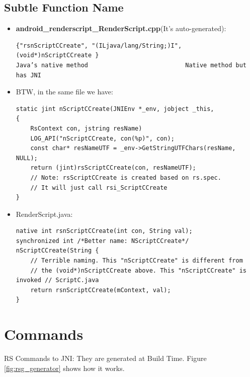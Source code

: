 \subsection{Subtle Function Name}
\label{ss:Stupid}

\begin{itemize}
	\item \textbf{android\_renderscript\_RenderScript.cpp}(It's auto-generated):
		\begin{lstlisting}[style=nonumbers]
{"rsnScriptCCreate", "(ILjava/lang/String;)I", (void*)nScriptCCreate }
Java’s native method				           Native method but has JNI
		\end{lstlisting} 
	\item BTW, in the same file we have:
		\begin{lstlisting}[style=nonumbers]
static jint nScriptCCreate(JNIEnv *_env, jobject _this,
{
	RsContext con, jstring resName)
	LOG_API("nScriptCCreate, con(%p)", con); 
	const char* resNameUTF = _env->GetStringUTFChars(resName, NULL); 
	return (jint)rsScriptCCreate(con, resNameUTF); 
	// Note: rsScriptCCreate is created based on rs.spec.
	// It will just call rsi_ScriptCCreate
}
		\end{lstlisting}
	\item RenderScript.java:
			\begin{lstlisting}[style=nonumbers]
native int rsnScriptCCreate(int con, String val); 
synchronized int /*Better name: NScriptCCreate*/ nScriptCCreate(String { 			
	// Terrible naming. This "nScriptCCreate" is different from
	// the (void*)nScriptCCreate above. This "nScriptCCreate" is invoked // ScriptC.java
	return rsnScriptCCreate(mContext, val);
}				           
			\end{lstlisting} 
\end{itemize} 


\section{\RS{} Commands}
\label{s:RSCommands}
RS Commands to JNI: They are generated at Build Time. Figure \ref{fig:rsg_generator} shows how it works.

